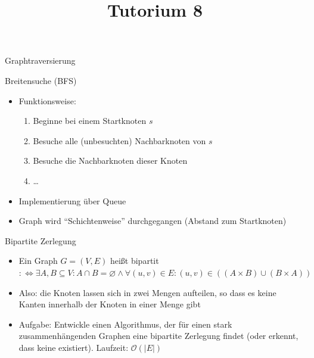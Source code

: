 
\title[Algorithmen I SS 14]{Tutorium 8}

\usepackage{alltt}




\begin{frame}
  \maketitle
\end{frame}

\begin{frame}
	\begin{center}
		\Huge
		Graphtraversierung
	\end{center}
\end{frame}

\begin{frame}{Breitensuche (BFS)}
	\begin{itemize}
		\item Funktionsweise:
			\begin{enumerate}
				\item Beginne bei einem Startknoten $s$
				\item Besuche alle (unbesuchten) Nachbarknoten von $s$
				\item Besuche die Nachbarknoten dieser Knoten
				\item …
			\end{enumerate}
		\item Implementierung über Queue
		\item Graph wird "`Schichtenweise"' durchgegangen (Abstand zum Startknoten)
	\end{itemize}
\end{frame}

\begin{frame}{Bipartite Zerlegung}
	\begin{itemize}
		\item Ein Graph $G = (V, E)$ heißt bipartit $:\Leftrightarrow \exists A, B \subseteq V: A \cap B = \varnothing  \wedge  \forall (u, v) \in E: (u, v) \in ((A \times B) \cup (B \times A))$
		\item Also: die Knoten lassen sich in zwei Mengen aufteilen, so dass es keine Kanten innerhalb der Knoten in einer Menge gibt
		\item Aufgabe: Entwickle einen Algorithmus, der für einen stark zusammenhängenden Graphen eine bipartite Zerlegung findet (oder erkennt, dass keine existiert). Laufzeit: $\mathcal{O}(|E|)$
	\end{itemize}
\end{frame}

